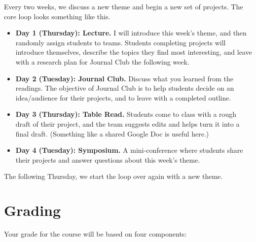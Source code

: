 \documentclass[11pt, letterpaper]{article}
\begin{document}
Every two weeks, we discuss a new theme and begin a new set of projects. The core loop looks something like this. 

\begin{itemize}
	\item \textbf{Day 1 (Thursday): Lecture.} I will introduce this week's theme, and then randomly assign students to teams. Students completing projects will introduce themselves, describe the topics they find most interesting, and leave with a research plan for Journal Club the following week.
	\item \textbf{Day 2 (Tuesday): Journal Club.} Discuss what you learned from the readings. The objective of Journal Club is to help students decide on an idea/audience for their projects, and to leave with a completed outline. 
	\item \textbf{Day 3 (Thursday): Table Read.} Students come to class with a rough draft of their project, and the team suggests edits and helps turn it into a final draft. (Something like a shared Google Doc is useful here.)
	\item \textbf{Day 4 (Tuesday): Symposium.} A mini-conference where students share their projects and answer questions about this week's theme.
\end{itemize}

\noindent The following Thursday, we start the loop over again with a new theme.

\section*{Grading}

Your grade for the course will be based on four components:
\end{document}
